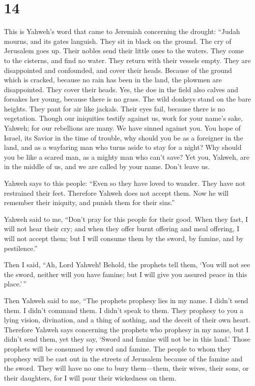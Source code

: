 \hypertarget{section-13}{%
\section{14}\label{section-13}}

 This is Yahweh's word that came to Jeremiah concerning
the drought:  ``Judah mourns, and its gates languish. They
sit in black on the ground. The cry of Jerusalem goes up. 
Their nobles send their little ones to the waters. They come to the
cisterns, and find no water. They return with their vessels empty. They
are disappointed and confounded, and cover their heads. 
Because of the ground which is cracked, because no rain has been in the
land, the plowmen are disappointed. They cover their heads.
 Yes, the doe in the field also calves and forsakes her
young, because there is no grass.  The wild donkeys stand
on the bare heights. They pant for air like jackals. Their eyes fail,
because there is no vegetation.  Though our iniquities
testify against us, work for your name's sake, Yahweh; for our
rebellions are many. We have sinned against you.  You hope
of Israel, its Savior in the time of trouble, why should you be as a
foreigner in the land, and as a wayfaring man who turns aside to stay
for a night?  Why should you be like a scared man, as a
mighty man who can't save? Yet you, Yahweh, are in the middle of us, and
we are called by your name. Don't leave us.

 Yahweh says to this people: ``Even so they have loved to
wander. They have not restrained their feet. Therefore Yahweh does not
accept them. Now he will remember their iniquity, and punish them for
their sins.''

 Yahweh said to me, ``Don't pray for this people for
their good.  When they fast, I will not hear their cry;
and when they offer burnt offering and meal offering, I will not accept
them; but I will consume them by the sword, by famine, and by
pestilence.''

 Then I said, ``Ah, Lord Yahweh! Behold, the prophets
tell them, `You will not see the sword, neither will you have famine;
but I will give you assured peace in this place.'\,''

 Then Yahweh said to me, ``The prophets prophesy lies in
my name. I didn't send them. I didn't command them. I didn't speak to
them. They prophesy to you a lying vision, divination, and a thing of
nothing, and the deceit of their own heart.  Therefore
Yahweh says concerning the prophets who prophesy in my name, but I
didn't send them, yet they say, `Sword and famine will not be in this
land.' Those prophets will be consumed by sword and famine.
 The people to whom they prophesy will be cast out in the
streets of Jerusalem because of the famine and the sword. They will have
no one to bury them---them, their wives, their sons, or their daughters,
for I will pour their wickedness on them.

